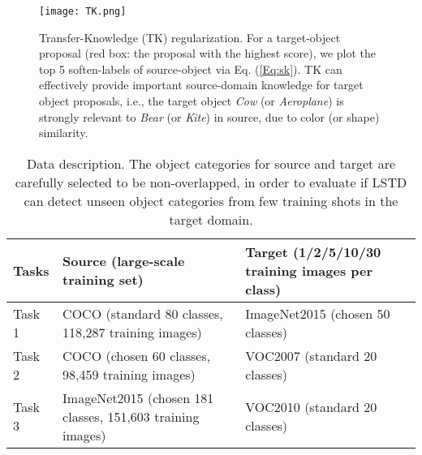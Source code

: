 \documentclass[letterpaper]{article} \usepackage{aaai18}  \usepackage{times}  \usepackage{helvet}  \usepackage{courier}  \usepackage{url}  \usepackage{graphicx}
\begin{document}
\begin{figure}[t]
\centering
\texttt{[image: TK.png]}
\caption{Transfer-Knowledge (TK) regularization.
For a target-object proposal (red box: the proposal with the highest score),
we plot the top 5 soften-labels of source-object via Eq. (\ref{Eq:sk}).
TK can effectively provide important source-domain knowledge for target object proposals,
i.e.,
the target object \textit{Cow} (or \textit{Aeroplane}) is strongly relevant to \textit{Bear} (or \textit{Kite}) in source,
due to color (or shape) similarity.}
\label{TKRegularization}
\end{figure}

\begin{table*}[t]
\centering
\begin{tabular}{l|l|l}
  \hline
Tasks & Source (large-scale training set) & Target (1/2/5/10/30 training images per class) \\
  \hline
  Task 1 & COCO (standard 80 classes, 118,287 training images) &  ImageNet2015 (chosen 50 classes) \\
  Task 2& COCO (chosen 60 classes, 98,459 training images)   &  VOC2007 (standard 20 classes) \\
  Task 3& ImageNet2015 (chosen 181 classes, 151,603 training images) & VOC2010 (standard 20 classes) \\
  \hline
\end{tabular}
\caption{Data description.
The object categories for source and target are carefully selected to be non-overlapped,
in order to evaluate if LSTD can detect unseen object categories from few training shots in the target domain.}
\label{DataDescription}
\end{table*}
\end{document}
